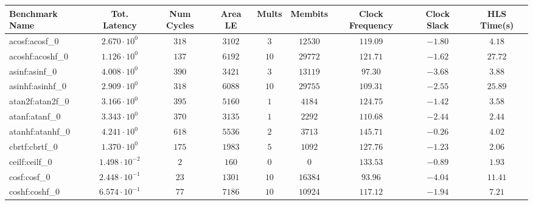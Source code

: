 \begin{tabular}{|l|c|c|c|c|c|c|c|c|}
\hline
Benchmark Name               & Tot. Latency            & Num Cycles & Area LE    & Mults   & Membits    & Clock Frequency & Clock Slack & HLS Time(s) \\
\hline
acosf:acosf\_0               & $ 2.670 \cdot 10^{0}  $ & $ 318    $ & $ 3102   $ & $ 3   $ & $ 12530  $ & $ 119.09      $ & $ -1.80   $ & $ 4.18    $ \\
acoshf:acoshf\_0             & $ 1.126 \cdot 10^{0}  $ & $ 137    $ & $ 6192   $ & $ 10  $ & $ 29772  $ & $ 121.71      $ & $ -1.62   $ & $ 27.72   $ \\
asinf:asinf\_0               & $ 4.008 \cdot 10^{0}  $ & $ 390    $ & $ 3421   $ & $ 3   $ & $ 13119  $ & $ 97.30       $ & $ -3.68   $ & $ 3.88    $ \\
asinhf:asinhf\_0             & $ 2.909 \cdot 10^{0}  $ & $ 318    $ & $ 6088   $ & $ 10  $ & $ 29755  $ & $ 109.31      $ & $ -2.55   $ & $ 25.89   $ \\
atan2f:atan2f\_0             & $ 3.166 \cdot 10^{0}  $ & $ 395    $ & $ 5160   $ & $ 1   $ & $ 4184   $ & $ 124.75      $ & $ -1.42   $ & $ 3.58    $ \\
atanf:atanf\_0               & $ 3.343 \cdot 10^{0}  $ & $ 370    $ & $ 3135   $ & $ 1   $ & $ 2292   $ & $ 110.68      $ & $ -2.44   $ & $ 2.44    $ \\
atanhf:atanhf\_0             & $ 4.241 \cdot 10^{0}  $ & $ 618    $ & $ 5536   $ & $ 2   $ & $ 3713   $ & $ 145.71      $ & $ -0.26   $ & $ 4.02    $ \\
cbrtf:cbrtf\_0               & $ 1.370 \cdot 10^{0}  $ & $ 175    $ & $ 1983   $ & $ 5   $ & $ 1092   $ & $ 127.76      $ & $ -1.23   $ & $ 2.06    $ \\
ceilf:ceilf\_0               & $ 1.498 \cdot 10^{-2} $ & $ 2      $ & $ 160    $ & $ 0   $ & $ 0      $ & $ 133.53      $ & $ -0.89   $ & $ 1.93    $ \\
cosf:cosf\_0                 & $ 2.448 \cdot 10^{-1} $ & $ 23     $ & $ 1301   $ & $ 10  $ & $ 16384  $ & $ 93.96       $ & $ -4.04   $ & $ 11.41   $ \\
coshf:coshf\_0               & $ 6.574 \cdot 10^{-1} $ & $ 77     $ & $ 7186   $ & $ 10  $ & $ 10924  $ & $ 117.12      $ & $ -1.94   $ & $ 7.21    $ \\

\end{tabular}
